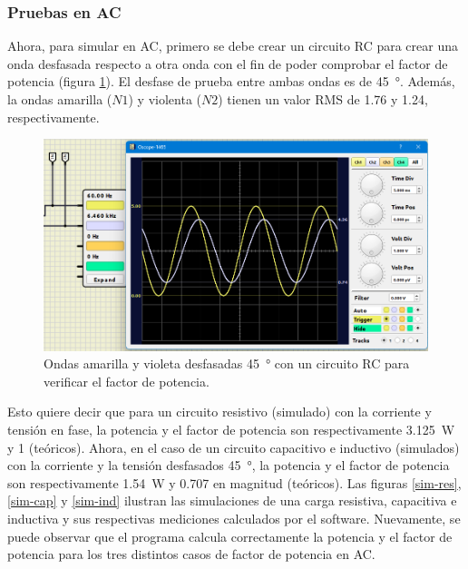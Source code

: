 \FloatBarrier

\subsubsection{Pruebas en AC}
Ahora, para simular en AC, primero se debe crear un circuito RC para crear una onda desfasada respecto a otra onda \cite{hayt} con el fin de poder comprobar el factor de potencia (figura \ref{oscope}). El desfase de prueba entre ambas ondas es de \SI{45}{\degree}. Además, la ondas amarilla ($N1$) y violenta ($N2$) tienen un valor RMS de 1.76 y 1.24, respectivamente.

\begin{figure}
    \centering
    \includegraphics[width=12cm]{Imagenes/oscope.png}
    \caption{Ondas amarilla y violeta desfasadas \SI{45}{\degree} con un circuito RC para verificar el factor de potencia.}
    \label{oscope}
\end{figure}

Esto quiere decir que para un circuito resistivo (simulado) con la corriente y tensión en fase, la potencia y el factor de potencia son respectivamente \SI{3.125}{\watt} y 1 (teóricos). Ahora, en el caso de un circuito capacitivo e inductivo (simulados) con la corriente y la tensión desfasados \SI{45}{\degree}, la potencia y el factor de potencia son respectivamente \SI{1.54}{\watt} y 0.707 en magnitud (teóricos). Las figuras \ref{sim-res}, \ref{sim-cap} y \ref{sim-ind} ilustran las simulaciones de una carga resistiva, capacitiva e inductiva y sus respectivas mediciones calculados por el software. Nuevamente, se puede observar que el programa calcula correctamente la potencia y el factor de potencia para los tres distintos casos de factor de potencia en AC.

